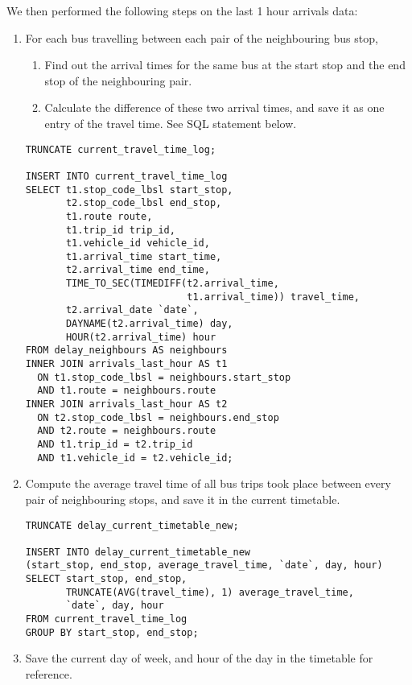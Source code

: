 \par We then performed the following steps on the last 1 hour arrivals data:

\begin{enumerate}
  \item For each bus travelling between each pair of the neighbouring bus stop,
  \begin{enumerate}
    \item Find out the arrival times for the same bus at the start stop and the end stop of the neighbouring pair.
    \item Calculate the difference of these two arrival times, and save it as one entry of the travel time. See SQL statement below.
  \end{enumerate}
\begin{verbatim}
TRUNCATE current_travel_time_log;

INSERT INTO current_travel_time_log
SELECT t1.stop_code_lbsl start_stop,
       t2.stop_code_lbsl end_stop,
       t1.route route,
       t1.trip_id trip_id,
       t1.vehicle_id vehicle_id,
       t1.arrival_time start_time,
       t2.arrival_time end_time,
       TIME_TO_SEC(TIMEDIFF(t2.arrival_time,
                            t1.arrival_time)) travel_time,
       t2.arrival_date `date`,
       DAYNAME(t2.arrival_time) day,
       HOUR(t2.arrival_time) hour
FROM delay_neighbours AS neighbours
INNER JOIN arrivals_last_hour AS t1
  ON t1.stop_code_lbsl = neighbours.start_stop
  AND t1.route = neighbours.route
INNER JOIN arrivals_last_hour AS t2
  ON t2.stop_code_lbsl = neighbours.end_stop
  AND t2.route = neighbours.route
  AND t1.trip_id = t2.trip_id
  AND t1.vehicle_id = t2.vehicle_id;
\end{verbatim}
  \item Compute the average travel time of all bus trips took place between every pair of neighbouring stops, and save it in the current timetable.

\begin{verbatim}
TRUNCATE delay_current_timetable_new;

INSERT INTO delay_current_timetable_new
(start_stop, end_stop, average_travel_time, `date`, day, hour)
SELECT start_stop, end_stop,
       TRUNCATE(AVG(travel_time), 1) average_travel_time,
       `date`, day, hour
FROM current_travel_time_log
GROUP BY start_stop, end_stop;
\end{verbatim}

  \item Save the current day of week, and hour of the day in the timetable for reference.
\end {enumerate}

